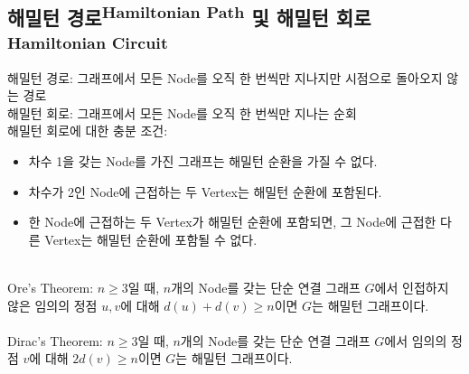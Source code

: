 \subsection{해밀턴 경로\textsuperscript{Hamiltonian Path} 및 해밀턴 회로\textsuperscript{Hamiltonian Circuit}}
해밀턴 경로: 그래프에서 모든 Node를 오직 한 번씩만 지나지만 시점으로 돌아오지 않는 경로\\
해밀턴 회로: 그래프에서 모든 Node를 오직 한 번씩만 지나는 순회\\
해밀턴 회로에 대한 충분 조건:
\begin{itemize}
    \item 차수 1을 갖는 Node를 가진 그래프는 해밀턴 순환을 가질 수 없다.
    \item 차수가 2인 Node에 근접하는 두 Vertex는 해밀턴 순환에 포함된다.
    \item 한 Node에 근접하는 두 Vertex가 해밀턴 순환에 포함되면, 그 Node에 근접한 다른 Vertex는 해밀턴 순환에 포함될 수 없다.
\end{itemize}\phantom{}\\
Ore's Theorem: $n \geq 3$일 때, $n$개의 Node를 갖는 단순 연결 그래프 $G$에서 인접하지 않은 임의의 정점 $u, v$에 대해 $d(u) + d(v) \geq n$이면 $G$는 해밀턴 그래프이다.\\\\
Dirac's Theorem: $n \geq 3$일 때, $n$개의 Node를 갖는 단순 연결 그래프 $G$에서 임의의 정점 $v$에 대해 $2d(v) \geq n$이면 $G$는 해밀턴 그래프이다.
\newpage
